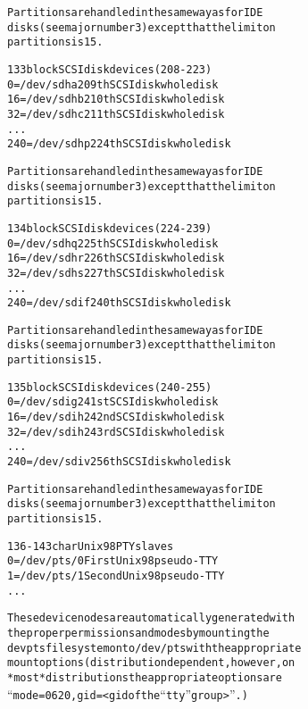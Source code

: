 \documentclass[a4paper,8pt,english]{sphinxmanual}
\begin{document}
\begin{alltt}
                Partitions are handled in the same way as for IDE
                disks (see major number 3) except that the limit on
                partitions is 15.

 133 block       SCSI disk devices (208-223)
                   0 = /dev/sdha         209th SCSI disk whole disk
                  16 = /dev/sdhb         210th SCSI disk whole disk
                  32 = /dev/sdhc         211th SCSI disk whole disk
                    ...
                 240 = /dev/sdhp         224th SCSI disk whole disk

                Partitions are handled in the same way as for IDE
                disks (see major number 3) except that the limit on
                partitions is 15.

 134 block       SCSI disk devices (224-239)
                   0 = /dev/sdhq         225th SCSI disk whole disk
                  16 = /dev/sdhr         226th SCSI disk whole disk
                  32 = /dev/sdhs         227th SCSI disk whole disk
                    ...
                 240 = /dev/sdif         240th SCSI disk whole disk

                Partitions are handled in the same way as for IDE
                disks (see major number 3) except that the limit on
                partitions is 15.

 135 block       SCSI disk devices (240-255)
                   0 = /dev/sdig         241st SCSI disk whole disk
                  16 = /dev/sdih         242nd SCSI disk whole disk
                  32 = /dev/sdih         243rd SCSI disk whole disk
                    ...
                 240 = /dev/sdiv         256th SCSI disk whole disk

                Partitions are handled in the same way as for IDE
                disks (see major number 3) except that the limit on
                partitions is 15.

 136-143 char   Unix98 PTY slaves
                  0 = /dev/pts/0        First Unix98 pseudo-TTY
                  1 = /dev/pts/1        Second Unix98 pseudo-TTY
                    ...

                These device nodes are automatically generated with
                the proper permissions and modes by mounting the
                devpts filesystem onto /dev/pts with the appropriate
                mount options (distribution dependent, however, on
                *most* distributions the appropriate options are
                ``mode=0620,gid=\textless{}gid of the ``tty'' group\textgreater{}''.)


\end{alltt}
\end{document}
